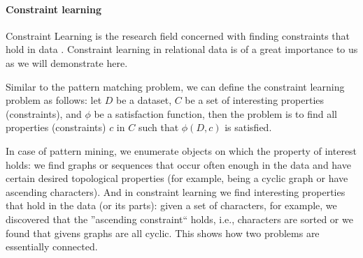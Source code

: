 \paragraph{Constraint learning} 
Constraint Learning is the research field concerned with finding 
constraints that hold in data
\parencite{constraint_learning,QUACQ,Conacq}. Constraint learning in
relational data is of a great importance to us as we will demonstrate
here.

Similar to the pattern matching problem, we can define 
the constraint learning problem as follows:
let $D$ be a dataset, $C$ be a set of interesting properties (constraints), and
$\phi$ be a satisfaction function, 
then the problem is to find all properties (constraints) $c$ in $C$ such that $\phi(D,c)$ is satisfied.

In case of pattern mining, we enumerate objects on which the property
of interest holds: we find graphs or sequences that occur often enough
in the data and have certain desired topological properties (for example, being a
cyclic graph or have ascending characters). And in constraint learning we find interesting
properties that hold in the data (or its parts): given a set of
characters, for example, we discovered that the ''ascending
constraint`` holds, i.e.,
characters are sorted or we found that givens graphs are all cyclic. This shows how two problems are essentially connected.


